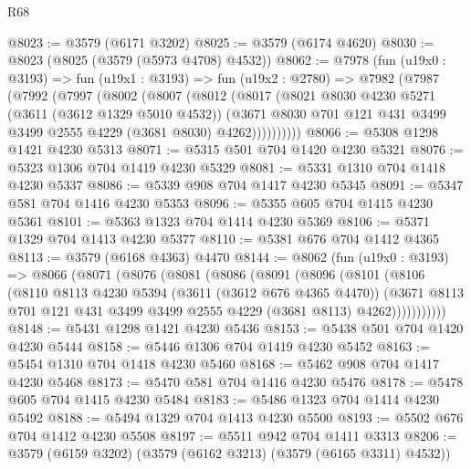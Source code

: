 \begin{lexlean}{R68}
\begin{coremodule}
@8023 := @3579 (@6171 @3202)
@8025 := @3579 (@6174 @4620)
@8030 := @8023 (@8025 (@3579 (@5973 @4708) @4532))
@8062 := @7978
    (fun (u19x0 : @3193) =>
    fun (u19x1 : @3193) =>
    fun (u19x2 : @2780) =>
    @7982
      (@7987
        (@7992
          (@7997
            (@8002
              (@8007
                (@8012
                  (@8017
                    (@8021
                      @8030
                      @4230
                      @5271
                      (@3611 (@3612 @1329 @5010 @4532))
                      (@3671
                        @8030
                        @701
                        @121
                        @431
                        @3499
                        @3499
                        @2555
                        @4229
                        (@3681 @8030)
                        @4262))))))))))
@8066 := @5308 @1298 @1421 @4230 @5313
@8071 := @5315 @501 @704 @1420 @4230 @5321
@8076 := @5323 @1306 @704 @1419 @4230 @5329
@8081 := @5331 @1310 @704 @1418 @4230 @5337
@8086 := @5339 @908 @704 @1417 @4230 @5345
@8091 := @5347 @581 @704 @1416 @4230 @5353
@8096 := @5355 @605 @704 @1415 @4230 @5361
@8101 := @5363 @1323 @704 @1414 @4230 @5369
@8106 := @5371 @1329 @704 @1413 @4230 @5377
@8110 := @5381 @676 @704 @1412 @4365
@8113 := @3579 (@6168 @4363) @4470
@8144 := @8062
    (fun (u19x0 : @3193) =>
    @8066
      (@8071
        (@8076
          (@8081
            (@8086
              (@8091
                (@8096
                  (@8101
                    (@8106
                      (@8110
                        @8113
                        @4230
                        @5394
                        (@3611 (@3612 @676 @4365 @4470))
                        (@3671
                          @8113
                          @701
                          @121
                          @431
                          @3499
                          @3499
                          @2555
                          @4229
                          (@3681 @8113)
                          @4262)))))))))))
@8148 := @5431 @1298 @1421 @4230 @5436
@8153 := @5438 @501 @704 @1420 @4230 @5444
@8158 := @5446 @1306 @704 @1419 @4230 @5452
@8163 := @5454 @1310 @704 @1418 @4230 @5460
@8168 := @5462 @908 @704 @1417 @4230 @5468
@8173 := @5470 @581 @704 @1416 @4230 @5476
@8178 := @5478 @605 @704 @1415 @4230 @5484
@8183 := @5486 @1323 @704 @1414 @4230 @5492
@8188 := @5494 @1329 @704 @1413 @4230 @5500
@8193 := @5502 @676 @704 @1412 @4230 @5508
@8197 := @5511 @942 @704 @1411 @3313
@8206 := @3579 (@6159 @3202) (@3579 (@6162 @3213) (@3579 (@6165 @3311) @4532))

\end{coremodule}
\end{lexlean}

